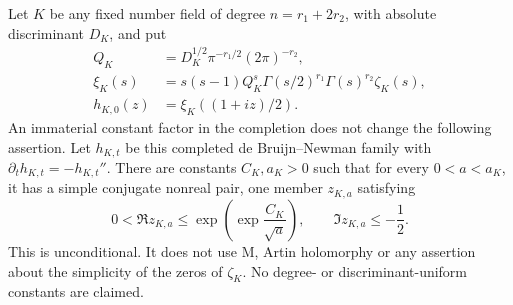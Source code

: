 \begin{corollary}
\label{cor:A051-dedekindheight}
Let \(K\) be any fixed number field of degree \(n=r_1+2r_2\),
with absolute discriminant \(D_K\), and put
\begin{align*}
 Q_K&=D_K^{1/2}\pi^{-r_1/2}(2\pi)^{-r_2},\\
 \xi_K(s)&=s(s-1)Q_K^s\Gamma(s/2)^{r_1}
                               \Gamma(s)^{r_2}\zeta_K(s),\\
 h_{K,0}(z)&=\xi_K((1+iz)/2).
\end{align*}
An immaterial constant factor in the completion does not change
the following assertion. Let \(h_{K,t}\) be this completed
de Bruijn--Newman family with \(\partial_t h_{K,t}=-h_{K,t}''\).
There are constants \(C_K,a_K>0\) such that for every
\(0<a<a_K\), it has a simple conjugate nonreal pair, one member
\(z_{K,a}\) satisfying
\[
 0<\Re z_{K,a}\le\exp\!\left(\exp\frac{C_K}{\sqrt a}\right),
                  \qquad \Im z_{K,a}\le-\frac12.
\]
This is unconditional. It does not use M, Artin holomorphy or
any assertion about the simplicity of the zeros of \(\zeta_K\).
No degree- or discriminant-uniform constants are claimed.
\end{corollary}

